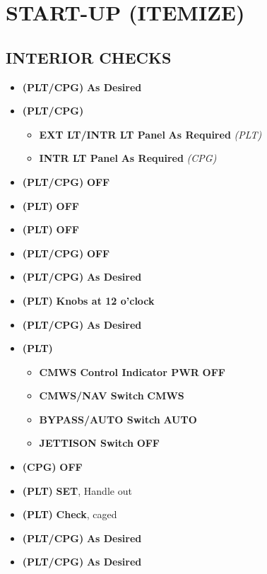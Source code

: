 \documentclass[fontHelvetica]{TechCheck}
\begin{document}
	\cleardoublepage

	\section{START-UP (ITEMIZE)}

	\subsection{INTERIOR CHECKS}
	\begin{itemize}[leftmargin=0.1\linewidth,rightmargin=0.1\linewidth, itemsep=4pt]
		\item {} \textbf{(PLT/CPG)} \dotfill \textbf{As Desired}
		\item {} \textbf{(PLT/CPG)} 
		\begin{itemize}[itemsep=4pt]
			\item \textbf{EXT LT/INTR LT Panel} \dotfill \textbf{As Required}
			\emph{(PLT)}
			\item \textbf{INTR LT Panel} \dotfill \textbf{As Required}
			\emph{(CPG)}
		\end{itemize}
		\item {} \textbf{(PLT/CPG)} \dotfill \textbf{OFF}
		\item {} \textbf{(PLT)} \dotfill \textbf{OFF}
		\item {} \textbf{(PLT)} \dotfill \textbf{OFF}
		\item {} \textbf{(PLT/CPG)} \dotfill \textbf{OFF}
		\item {} \textbf{(PLT/CPG)} \dotfill \textbf{As Desired}
		\item {} \textbf{(PLT)} \dotfill \textbf{Knobs at 12 o'clock}
		\item {} \textbf{(PLT/CPG)} \dotfill \textbf{As Desired}
		\item {} \textbf{(PLT)}
		\begin{itemize}[itemsep=4pt]
				\item \textbf{CMWS Control Indicator PWR} \dotfill \textbf{OFF}
				\item \textbf{CMWS/NAV Switch} \dotfill \textbf{CMWS}
				\item \textbf{BYPASS/AUTO Switch} \dotfill \textbf{AUTO}
				\item \textbf{JETTISON Switch} \dotfill \textbf{OFF}
		\end{itemize}
		\item {} \textbf{(CPG)} \dotfill \textbf{OFF}
		\item {} \textbf{(PLT)} \dotfill \textbf{SET}, Handle out
		\item {} \textbf{(PLT)} \dotfill \textbf{Check}, caged
		\item {} \textbf{(PLT/CPG)} \dotfill \textbf{As Desired}
		\item {} \textbf{(PLT/CPG)} \dotfill \textbf{As Desired} \\
	\end{itemize}
\end{document}
